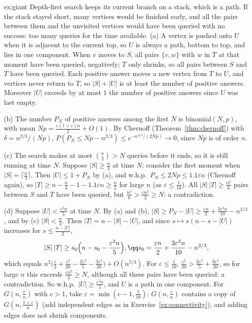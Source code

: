 \begin{solution}{ex:giant}
\idea Depth-first search keeps its current branch on a stack, which is a path. If the stack stayed short, many
vertices would be finished early, and all the pairs between them and the unvisited vertices would have been queried
with no success: too many queries for the time available.
\writeup (a) A vertex is pushed onto $U$ when it is adjacent to the current top, so $U$ is always a path, bottom to top, and lies in one component.
When $v$ moves to $S$, all pairs $\{v,w\}$ with $w$ in $T$ at that moment have been queried, negatively; $T$ only shrinks, so all pairs between $S$ and $T$ have
been queried. Each positive answer moves a new vertex from $T$ to $U$, and vertices never return to $T$, so $|S|+|U|$ is at least the number of positive
answers. Moreover $|U|$ exceeds by at most $1$ the number of positive answers since $U$ was last empty.

(b) The number $P_N$ of positive answers among the first $N$ is binomial$(N,p)$, with mean $Np=\frac{\varepsilon(1+\varepsilon)n}2+O(1)$. By Chernoff (Theorem~\ref{thm:chernoff}) with $\delta=n^{2/3}/(Np)$,
$P(P_N\le Np-n^{2/3})\le e^{-n^{4/3}/(2Np)}\to0$, since $Np$ is of order $n$.

(c) The search makes at most $\binom n2>N$ queries before it ends, so it is still running at time $N$. Suppose $|S|\ge\frac n3$ at time $N$; consider the first moment
when $|S|=\lceil\frac n3\rceil$. Then $|U|\le1+P_N$ by (a), and w.h.p.\ $P_N\le2Np\le1.1\varepsilon n$ (Chernoff again), so
$|T|\ge n-\frac n3-1-1.1\varepsilon n\ge\frac n2$ for large $n$ (as $\varepsilon\le\frac1{10}$). All $|S|\,|T|\ge\frac{n^2}6$ pairs between $S$ and $T$ have been queried, but $\frac{n^2}6>\frac{\varepsilon n^2}2\ge N$: a contradiction.

(d) Suppose $|U|<\frac{\varepsilon^2n}5$ at time $N$. By (a) and (b), $|S|\ge P_N-|U|\ge\frac{\varepsilon n}2+\frac{3\varepsilon^2n}{10}-n^{2/3}$, and by (c) $|S|<\frac n3$. Then
$|T|=n-|S|-|U|$, and since $s\mapsto s(n-s-|U|)$ increases for $s\le\frac{n-|U|}2$,
\[
\begin{gathered}|S|\,|T|\ge s_0\Bigl(n-s_0-\frac{\varepsilon^2n}5\Bigr),\qq s_0=\frac{\varepsilon n}2+\frac{3\varepsilon^2n}{10}-n^{2/3},\end{gathered}
\]
which equals $n^2\bigl(\frac\varepsilon2+\frac{\varepsilon^2}{20}-\frac{2\varepsilon^3}5-\frac{3\varepsilon^4}{20}\bigr)+O(n^{5/3})$. For $\varepsilon\le\frac1{10}$, $\frac{\varepsilon^2}{20}>\frac{2\varepsilon^3}5+\frac{3\varepsilon^4}{20}$, so for large $n$ this
exceeds $\frac{\varepsilon n^2}2\ge N$, although all these pairs have been queried: a contradiction. So w.h.p.\ $|U|\ge\frac{\varepsilon^2n}5$, and $U$ is a path in one component. For
$G(n,\frac cn)$ with $c>1$, take $\varepsilon=\min(c-1,\frac1{10})$: $G(n,\frac cn)$ contains a copy of $G(n,\frac{1+\varepsilon}n)$ (add independent edges as in Exercise~\ref{ex:connectivity}), and adding edges
does not shrink components.
\end{solution}


